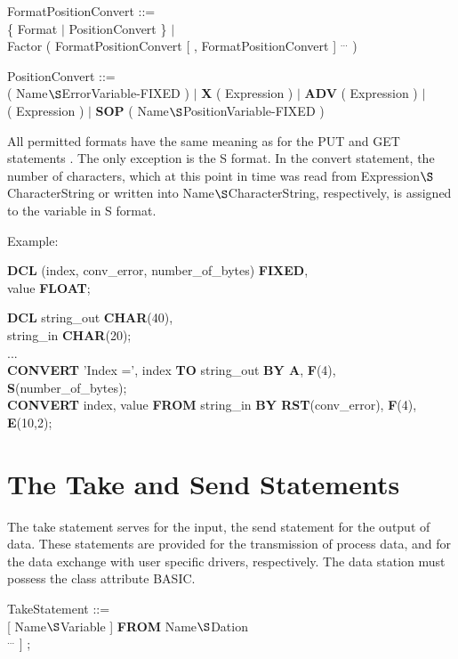 FormatPositionConvert ::=\\
\x [ Factor ] \{ Format $\mid$ PositionConvert \} $\mid$\\
\x Factor ( FormatPositionConvert [ , FormatPositionConvert ] $^{...}$ )

PositionConvert ::=\\
 ( Name$\S $ErrorVariable-FIXED ) $\mid$ {\bf X} ( Expression ) $\mid$ {\bf ADV} ( Expression ) $\mid$\\
 ( Expression ) $\mid$ {\bf SOP} ( Name$\S $PositionVariable-FIXED )

All permitted formats have the same meaning as for the PUT and GET
statements .
The only exception is the S format. In the convert
statement, the number of characters, which at this point in time was
read from Expression$\S $CharacterString or written into
Name$\S $CharacterString, respectively, is assigned to the variable in S
format.

Example:

\begin{tabbing}
{\bf DCL} (index, conv\_error, number\_of\_bytes) \= {\bf FIXED},\\
\x        value                                   \> {\bf FLOAT};\\
\end{tabbing}

{\bf DCL} string\_out {\bf CHAR}(40),\\
\x string\_in {\bf CHAR}(20);\\
...\\
{\bf CONVERT} 'Index =', index {\bf TO} string\_out {\bf BY A}, {\bf F}(4), {\bf S}(number\_of\_bytes);\\
{\bf CONVERT} index, value {\bf FROM} string\_in {\bf BY RST}(conv\_error), {\bf F}(4), {\bf E}(10,2);

\section{The Take and Send Statements}    %
\label{sec_take_send}

The take statement serves for the input, the send statement for the
output of data. These statements are provided for the transmission of
process data, and for the data exchange with user specific drivers,
respectively. The data station must possess the class attribute BASIC.

TakeStatement ::=\\
 [ Name$\S $Variable ] {\bf FROM} Name$\S $Dation\\
\x \x [ {\bf BY} RST-S-CTRL-Format [ , RST-S-CTRL-Format ] $^{...}$ ] ;

